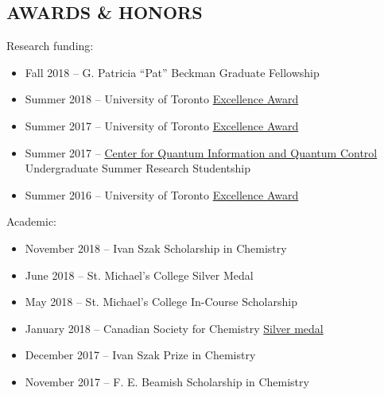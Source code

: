 \documentclass[9pt, margin]{res}
\begin{document}
\begin{resume}
\section{AWARDS \& HONORS} 
Research funding:
\begin{itemize}
	\item Fall 2018  -- G. Patricia “Pat” Beckman Graduate Fellowship %
	\item Summer 2018 -- University of Toronto {\href{http://www.research.utoronto.ca/research-funding-opportunities/2013-university-of-toronto-excellence-awards-utea/}{Excellence Award}} %
	\item Summer 2017 -- University of Toronto {\href{http://www.research.utoronto.ca/research-funding-opportunities/2013-university-of-toronto-excellence-awards-utea/}{Excellence Award}} %
	\item Summer 2017 -- \href{https://cqiqc.physics.utoronto.ca/programs/index.html}{Center for Quantum Information and Quantum Control} Undergraduate Summer Research Studentship %
	\item Summer 2016 -- University of Toronto \href{http://www.research.utoronto.ca/research-funding-opportunities/2013-university-of-toronto-excellence-awards-utea/}{Excellence Award} %
\end{itemize}
Academic:
\begin{itemize}
	\item November 2018 -- Ivan Szak Scholarship in Chemistry %
	\item June 2018 -- St. Michael's College Silver Medal %
	\item May 2018 -- St. Michael's College In-Course Scholarship %
	\item January 2018 -- Canadian Society for Chemistry \href{http://www.cheminst.ca/awards/student-awards/csc-silver-medal} {Silver medal} %
	\item December 2017 -- Ivan Szak Prize in Chemistry %
	\item November 2017 -- F. E. Beamish Scholarship in Chemistry %

\end{itemize}
\end{resume}
\end{document}
